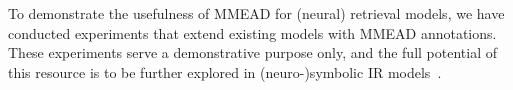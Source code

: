 


To demonstrate the usefulness of MMEAD for (neural) retrieval models, we have conducted experiments that extend existing models with MMEAD annotations.
These experiments serve a demonstrative purpose only, and the full potential of this resource is to be further explored in (neuro-)symbolic IR models~\citep{Gerritse:2022:EMBERT,Tran:2022:DRE}.

